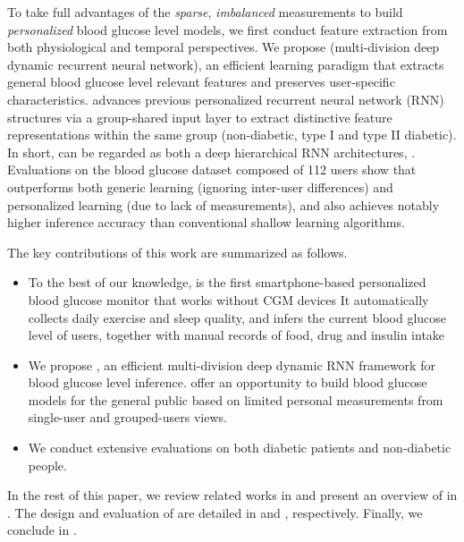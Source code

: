 To take full advantages of the \textit{sparse}, \textit{imbalanced} measurements to build \textit{personalized} blood glucose level models, we first conduct feature extraction from both physiological and temporal perspectives. 
We propose \modelname (multi-division deep dynamic recurrent neural network), an efficient learning paradigm that extracts general blood glucose level relevant features and preserves user-specific characteristics.
\modelname advances previous personalized recurrent neural network (RNN) structures via a group-shared input layer to extract distinctive feature representations within the same group (\ie non-diabetic, type I and type II diabetic).
In short, \modelname can be regarded as both a deep hierarchical RNN architectures, .
Evaluations on the blood glucose dataset composed of 112 users  show that \modelname outperforms both generic learning (\ie ignoring inter-user differences) and personalized learning (due to lack of measurements), and also achieves notably higher inference accuracy than conventional shallow learning algorithms.

The key contributions of this work are summarized as follows.
\begin{itemize}
  \item
  To the best of our knowledge, \sysname is the first smartphone-based personalized blood glucose monitor that works without CGM devices 
  It automatically collects daily exercise and sleep quality, and infers the current blood glucose level of users, together with manual records of food, drug and insulin intake 
  \item
  We propose \modelname, an efficient multi-division deep dynamic RNN framework for blood glucose level inference.
   offer an opportunity to build blood glucose models for the general public based on limited personal measurements from single-user and grouped-users views.
  \item
  We conduct extensive evaluations on both diabetic patients and non-diabetic people.
\end{itemize}

In the rest of this paper, we review related works in  and present an overview of \sysname in .
The design and evaluation of \sysname are detailed in  and , respectively.
Finally, we conclude in .

